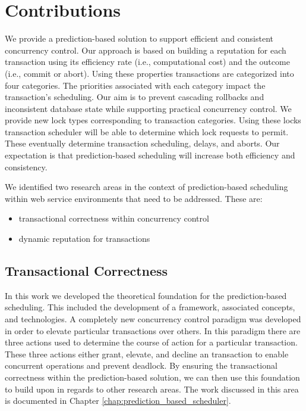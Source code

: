 \section{Contributions}
We provide a prediction-based solution to support efficient and consistent concurrency control. Our approach is based on building a reputation for each transaction using its efficiency rate (i.e., computational cost) and the outcome (i.e., commit or abort). Using these properties transactions are categorized into four categories. The priorities associated with each category impact the transaction's scheduling. Our aim is to prevent cascading rollbacks and inconsistent database state while supporting practical concurrency control. We provide new lock types corresponding to transaction categories. Using these locks transaction scheduler will be able to determine which lock requests to permit. These eventually determine transaction scheduling, delays, and aborts. Our expectation is that prediction-based scheduling will increase both efficiency and consistency.

We identified two research areas in the context of prediction-based scheduling within web service environments that need to be addressed. These are:
\begin{itemize}
    \item transactional correctness within concurrency control
    \item dynamic reputation for transactions
\end{itemize}

\subsection{Transactional Correctness}
In this work we developed the theoretical foundation for the prediction-based scheduling. This included the development of a framework, associated concepts, and technologies. A completely new concurrency control paradigm was developed in order to elevate particular transactions over others. In this paradigm there are three actions used to determine the course of action for a particular transaction. These three actions either grant, elevate, and decline an transaction to enable concurrent operations and prevent deadlock. By ensuring the transactional correctness within the prediction-based solution, we can then use this foundation to build upon in regards to other research areas. The work discussed in this area is documented in Chapter \ref{chap:prediction_based_scheduler}.

